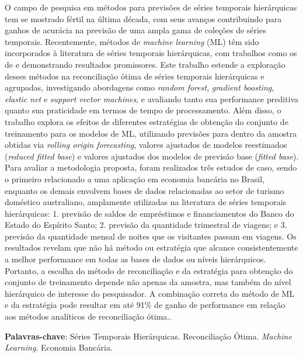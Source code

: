 

\setlength{\absparsep}{18pt}
\begin{resumo}
  O campo de pesquisa em métodos para previsões de séries temporais hierárquicas tem se mostrado fértil na última década, com seus avanços contribuindo para ganhos de acurácia na previsão de uma ampla gama de coleções de séries temporais. Recentemente, métodos de \textit{machine learning} (ML) têm sido incorporados à literatura de séries temporais hierárquicas, com trabalhos como os de \textcite{spiliotis_hierarchical_2021} e \textcite{makridakis_m5_2022} demonstrando resultados promissores. Este trabalho estende a exploração desses métodos na reconciliação ótima de séries temporais hierárquicas e agrupadas, investigando abordagens como \textit{random forest}, \textit{gradient boosting}, \textit{elastic net} e \textit{support vector machines}, e avaliando tanto sua performance preditiva quanto sua praticidade em termos de tempo de processamento. Além disso, o trabalho explora os efeitos de diferentes estratégias de obtenção do conjunto de treinamento para os modelos de ML, utilizando previsões para dentro da amostra obtidas via \textit{rolling origin forecasting}, valores ajustados de modelos reestimados (\textit{reduced fitted base}) e valores ajustados dos modelos de previsão base (\textit{fitted base}). Para avaliar a metodologia proposta, foram realizados três estudos de caso, sendo o primeiro relacionado a uma aplicação em economia bancária no Brasil, enquanto os demais envolvem bases de dados relacionadas ao setor de turismo doméstico australiano, amplamente utilizadas na literatura de séries temporais hierárquicas: 1. previsão de saldos de empréstimos e financiamentos do Banco do Estado do Espírito Santo; 2. previsão da quantidade trimestral de viagens; e 3. previsão da quantidade mensal de noites que os visitantes passam em viagens. Os resultados revelam que não há método ou estratégia que alcance consistentemente a melhor performance em todas as bases de dados ou níveis hierárquicos. Portanto, a escolha do método de reconciliação e da estratégia para obtenção do conjunto de treinamento depende não apenas da amostra, mas também do nível hierárquico de interesse do pesquisador. A combinação correta do método de ML e da estratégia pode resultar em até 91\% de ganho de performance em relação aos métodos analíticos de reconciliação ótima..

  \textbf{Palavras-chave}: Séries Temporais Hierárquicas. Reconciliação Ótima. \textit{Machine Learning}. Economia Bancária.
\end{resumo}

